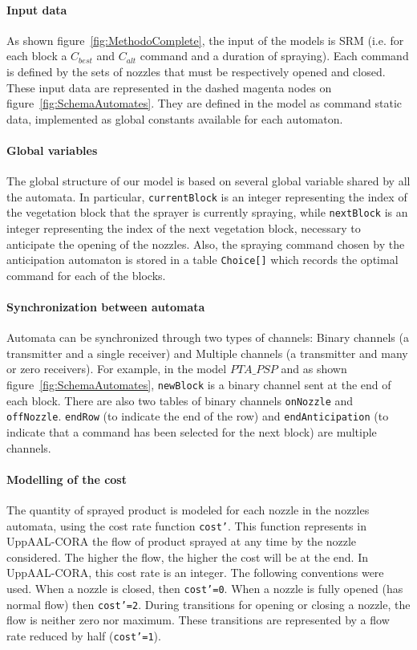 \documentclass[preprint,3p,times,twocolumn]{elsarticle}
\begin{document}
\paragraph{\textbf{Input data}}
As shown figure~\ref{fig:MethodoComplete}, the input of the models is SRM (i.e. for each block a $C_{best}$ and $C_{alt}$ command and a duration of spraying).
Each command is defined by the sets of nozzles that must be respectively opened and closed. These input data are represented in the dashed magenta nodes on figure~\ref{fig:SchemaAutomates}. They are defined in the model as command static data, implemented as global constants available for each automaton.

\paragraph{\textbf{Global variables}}
The global structure of our model is based on several global variable shared by all the automata. In particular, \texttt{currentBlock} is an integer representing the index of the vegetation block that the sprayer is currently spraying, while \texttt{nextBlock} is an integer representing the index of the next vegetation block, necessary to anticipate the opening of the nozzles. Also, the spraying command chosen by the anticipation automaton is stored in a table \texttt{Choice[]} which records the optimal command for each of the blocks.

%
\paragraph{\textbf{Synchronization between automata}} Automata can be synchronized through two types of channels: Binary channels (a transmitter and a single receiver) and Multiple channels (a transmitter and many or zero receivers). For example, in the model $PTA\_PSP$ and as shown figure~\ref{fig:SchemaAutomates}, \texttt{newBlock} is a binary channel sent at the end of each block. There are also two tables of binary channels \texttt{onNozzle} and \texttt{offNozzle}. \texttt{endRow} (to indicate the end of the row) and \texttt{endAnticipation} (to indicate that a command has been selected for the next block) are multiple channels.


\paragraph{\textbf{Modelling of the cost}} 
The quantity of sprayed product is modeled for each nozzle in the nozzles automata, using the cost rate function \texttt{cost'}. This function represents in UppAAL-CORA the flow of product sprayed at any time by the nozzle considered. The higher the flow, the higher the cost will be at the end. In UppAAL-CORA, this cost rate is an integer. The following conventions were used. When a nozzle is closed, then \texttt{cost'=0}. When a nozzle is fully opened (has normal flow) then \texttt{cost'=2}. During transitions for opening or closing a nozzle, the flow is neither zero nor maximum. These transitions are represented by a flow rate reduced by half (\texttt{cost'=1}).
\end{document}
